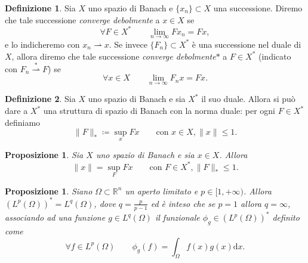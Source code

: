 \documentclass[a4paper,11pt]{book}
\theoremstyle{plain}
\newtheorem{prop}[teo]{Proposizione}
\theoremstyle{definition}
\newtheorem{defn}{Definizione}[chapter]
\theoremstyle{remark}
\newcommand{\R}{\mathbb{R}}
\newcommand{\norm}[1]{\lVert#1\rVert}
\newcommand{\weakconv}{\rightharpoonup}
\newcommand{\weakconvs}{\overset{\ast}{\rightharpoonup}}
\newcommand{\dx}{\text{d}x}
\begin{document}
\begin{defn}
	Sia $X$ uno spazio di Banach e $\{x_{n}\}\subset X$ una successione. Diremo che tale successione \textit{converge debolmente} a $x\in X$ se
	\[
		\forall F\in X^{*}\qquad \lim_{n\to \infty}Fx_{n}=Fx,
	\]
	e lo indicheremo con $x_{n}\weakconv x$.
	Se invece $\{F_{n}\}\subset X^{*}$ è una successione nel duale di $X$, allora diremo che tale successione \textit{converge debolmente}$*$ a $F\in X^{*}$ (indicato con $F_{n}\weakconvs F$) se
	\[
		\forall x\in X\qquad \lim_{n\to\infty}F_{n}x = Fx.
	\]
\end{defn}

\begin{defn}
	Sia $X$ uno spazio di Banach e sia $X^{*}$ il suo duale. Allora si può dare a $X^{*}$ una struttura di spazio di Banach con la norma duale: per ogni $F\in X^{*}$ definiamo
	\[
		\norm{F}_{*}\coloneqq \sup_{x}Fx\qquad \text{con }x\in X, \norm{x}\leq 1.
	\]
\end{defn}

\begin{prop}\label{prop:8}
	Sia $X$ uno spazio di Banach e sia $x\in X$. Allora
	\[
		\norm{x} = \sup_{F}Fx\qquad\text{con }F\in X^{*}, \norm{F}_{*}\leq 1.
	\]
\end{prop}

\begin{prop}
	Siano $\Omega\subset\R^{n}$ un aperto limitato e $p{\in}[1,+\infty)$. Allora $(L^{p}(\Omega))^{*} = L^{q}(\Omega)$, dove $q=\frac{p}{p-1}$ ed è inteso che se $p=1$ allora $q=\infty$, associando ad una funzione $g\in L^{q}(\Omega)$ il funzionale $\phi_{g}\in (L^{p}(\Omega))^{*}$ definito come
	\[
		\forall f\in L^{p}(\Omega)\qquad \phi_{g}(f) = \int_{\Omega}f(x)g(x)\dx.
	\]
\end{prop}
\end{document}
